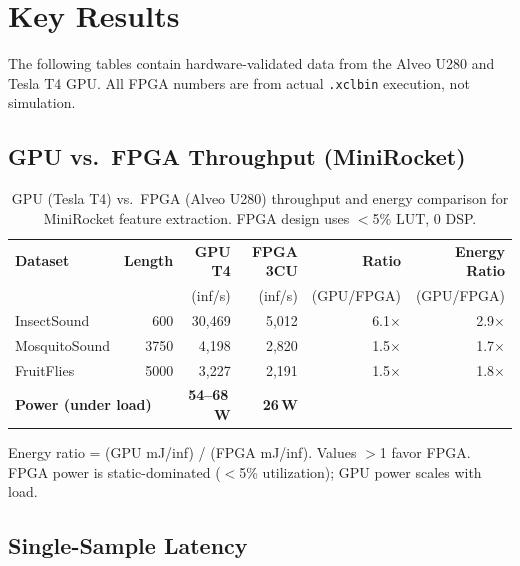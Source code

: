 \documentclass[11pt]{article}
\begin{document}
\section{Key Results}

The following tables contain hardware-validated data from the Alveo U280 and
Tesla T4 GPU. All FPGA numbers are from actual \texttt{.xclbin} execution,
not simulation.

\subsection{GPU vs.\ FPGA Throughput (MiniRocket)}

\begin{table}[H]
\centering
\caption{GPU (Tesla T4) vs.\ FPGA (Alveo U280) throughput and energy comparison
for MiniRocket feature extraction. FPGA design uses $<$5\% LUT, 0 DSP.}
\label{tab:gpu_comparison}
\begin{tabular}{lrrrrr}
\toprule
\textbf{Dataset} & \textbf{Length} & \textbf{GPU T4} & \textbf{FPGA 3CU} & \textbf{Ratio} & \textbf{Energy Ratio} \\
 & & (inf/s) & (inf/s) & (GPU/FPGA) & (GPU/FPGA) \\
\midrule
InsectSound   & 600  & 30{,}469 & 5{,}012 & 6.1$\times$ & 2.9$\times$ \\
MosquitoSound & 3750 & 4{,}198  & 2{,}820 & 1.5$\times$ & 1.7$\times$ \\
FruitFlies    & 5000 & 3{,}227  & 2{,}191 & 1.5$\times$ & 1.8$\times$ \\
\midrule
\multicolumn{2}{l}{\textbf{Power (under load)}} & \textbf{54--68\,W} & \textbf{26\,W} & & \\
\bottomrule
\end{tabular}

\vspace{0.5em}

\begin{minipage}{\textwidth}
\footnotesize
Energy ratio = (GPU mJ/inf) / (FPGA mJ/inf). Values $>$1 favor FPGA.
FPGA power is static-dominated ($<$5\% utilization); GPU power scales with load.
\end{minipage}
\end{table}

\subsection{Single-Sample Latency}
\end{document}
